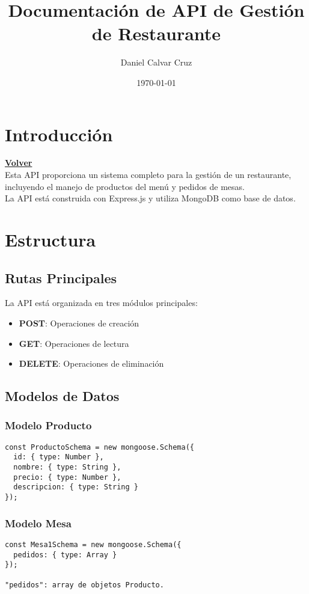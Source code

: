 \documentclass[12pt]{article}
\title{Documentación de API de Gestión de Restaurante}
\author{Daniel Calvar Cruz}
\date{\today}
\begin{document}
\maketitle

\tableofcontents
\newpage

\section{Introducción}
\hyperlink{anchor-indice}{\textbf{Volver}}\\

Esta API proporciona un sistema completo para la gestión de un restaurante, incluyendo el manejo de productos del menú y pedidos de mesas.\\

La API está construida con Express.js y utiliza MongoDB como base de datos.

\section{Estructura}

\subsection{Rutas Principales}
La API está organizada en tres módulos principales:

\begin{itemize}
    \item \textbf{POST}: Operaciones de creación
    \item \textbf{GET}: Operaciones de lectura
    \item \textbf{DELETE}: Operaciones de eliminación
\end{itemize}

\subsection{Modelos de Datos}

\subsubsection{Modelo Producto}
\begin{verbatim}
const ProductoSchema = new mongoose.Schema({
  id: { type: Number },
  nombre: { type: String },
  precio: { type: Number },
  descripcion: { type: String }
});
\end{verbatim}

\subsubsection{Modelo Mesa}
\begin{verbatim}
const Mesa1Schema = new mongoose.Schema({
  pedidos: { type: Array }
});

"pedidos": array de objetos Producto.
\end{verbatim}
\end{document}
